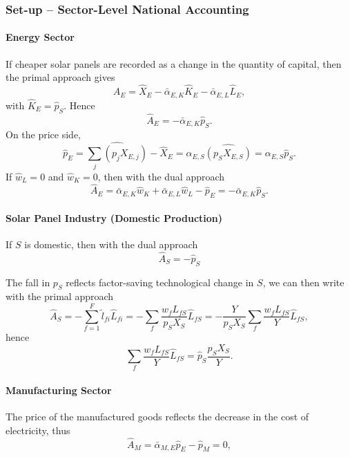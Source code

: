 \documentclass[11pt]{article}
\begin{document}
\subsubsection{Set-up -- Sector-Level National Accounting}

\paragraph{Energy Sector}
If cheaper solar panels are recorded as a change in the quantity of capital, then the primal approach gives
\[
\hat{A}_E=\hat{X}_E-\bar{\alpha}_{E,K}\hat{K}_E-\bar{\alpha}_{E,L}\hat{L}_E,
\]
with $\hat{K}_E=\hat{p}_S$. Hence
\[
\hat{A}_E=-\bar{\alpha}_{E,K}\hat{p}_S.
\]
On the price side,
\[
\hat{p}_E=\widehat{\sum_j(p_jX_{E,j})}-\hat{X}_E=\alpha_{E,S}\widehat{(p_SX_{E,S})}=\alpha_{E,S}\hat{p}_S.
\]
If $\hat{w}_L=0$ and $\hat{w}_K=0$, then with the dual approach
\[
\hat{A}_E=\bar{\alpha}_{E,K}\hat{w}_K+\bar{\alpha}_{E,L}\hat{w}_L-\hat{p}_E=-\bar{\alpha}_{E,K}\hat{p}_S.
\]

\paragraph{Solar Panel Industry (Domestic Production)}
If $S$ is domestic, then with the dual approach
\begin{equation}
    \hat{A}_S=-\hat{p}_S
\end{equation}

The fall in $p_S$ reflects factor-saving technological change in $S$, we can then write with the primal approach
\begin{equation*}
\hat{A}_S=-\sum_{f=1}^F \tilde{l}_{fi}\hat{L}_{fi}=-\sum_{f} \frac{w_fL_{fS}}{p_SX_S}\hat{L}_{fS}=-\frac{Y}{p_SX_S}\sum_{f} \frac{w_fL_{fS}}{Y}\hat{L}_{fS},
\end{equation*}
hence
\begin{equation}
\label{eq_factors_solarPV}
\sum_{f} \frac{w_fL_{fS}}{Y}\hat{L}_{fS}=\hat{p}_S\frac{p_SX_S}{Y}.
\end{equation}

\paragraph{Manufacturing Sector}
The price of the manufactured goods reflects the decrease in the cost of electricity, thus
\begin{equation*}
    \hat{A}_M=\bar{\alpha}_{M,E}\hat{p}_E-\hat{p}_M=0,
\end{equation*}
\end{document}
